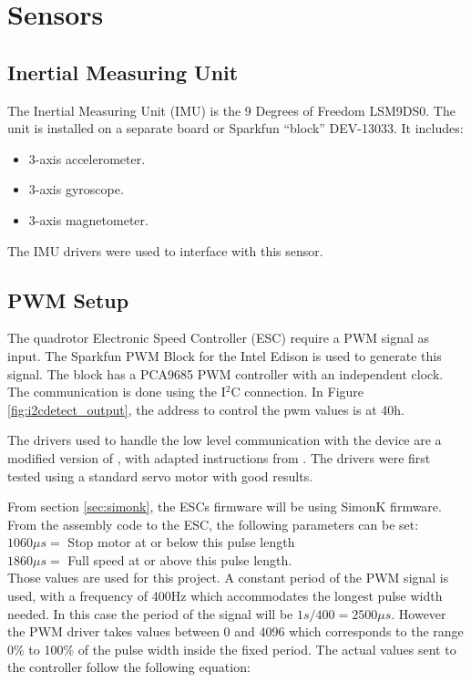 \documentclass[letterpaper, 12pt]{article}
\begin{document}
\section{Sensors}

\subsection{Inertial Measuring Unit}

The Inertial Measuring Unit (IMU) is the 9 Degrees of Freedom LSM9DS0\cite{imu_datasheet}. The unit is installed on a separate board or Sparkfun ``block'' DEV-13033. It includes:

\begin{itemize}
 \item 3-axis accelerometer.
 \item 3-axis gyroscope.
 \item 3-axis magnetometer.
\end{itemize}

The IMU drivers \cite{imu_driver} were used to interface with this sensor.

\subsection{PWM Setup}
The quadrotor Electronic Speed Controller (ESC) require a PWM signal as input. The Sparkfun PWM Block for the Intel Edison is used to generate this signal. The block has a PCA9685 PWM controller \cite{pwm_controller} with an independent clock. The communication is done using the I$^2$C connection. In Figure \ref{fig:i2cdetect_output}, the address to control the pwm values is at 40h.

The drivers used to handle the low level communication with the device are a modified version of \cite{pwm_driver}, with adapted instructions from \cite{pwm_driver_instructions}. The drivers were first tested using a standard servo motor with good results.

From section \ref{sec:simonk}, the ESCs firmware will be using SimonK firmware. From the assembly code to the ESC, the following parameters can be set:\\

\noindent $1060\mu s =$  Stop motor at or below this pulse length \\
$1860\mu s =$  Full speed at or above this pulse length.\\

Those values are used for this project. A constant period of the PWM signal is used, with a frequency of 400Hz which accommodates the longest pulse width needed. In this case the period of the signal will be $1s/400 = 2500\mu s$. However the PWM driver takes values between 0 and 4096 which corresponds to the range 0\% to 100\% of the pulse width inside the fixed period. The actual values sent to the controller follow the following equation:
\end{document}
